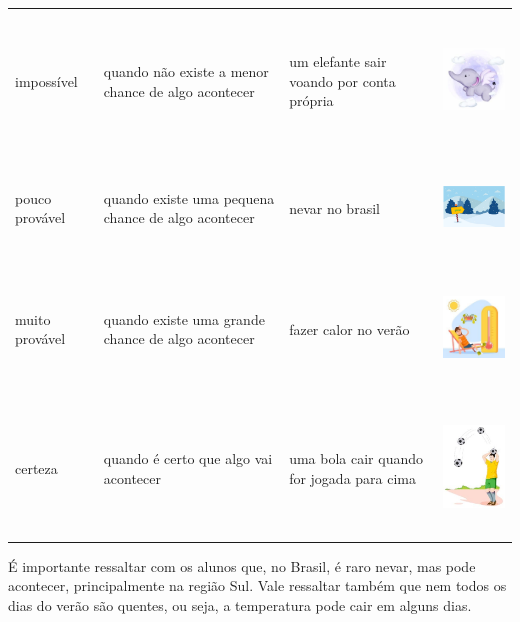 \begin{longtable}[]{@{}llll@{}}
\toprule
impossível & quando não existe a menor chance de algo acontecer & um
elefante sair voando por conta própria &
\includegraphics[width=1.42708in,height=1.42708in]{media/image76.jpg}\tabularnewline
pouco provável & quando existe uma pequena chance de algo acontecer &
nevar no brasil &
\includegraphics[width=1.52602in,height=1.01167in]{media/image77.png}\tabularnewline
muito provável & quando existe uma grande chance de algo acontecer &
fazer calor no verão &
\includegraphics[width=1.30208in,height=1.30208in]{media/image78.jpg}\tabularnewline
certeza & quando é certo que algo vai acontecer & uma bola cair quando
for jogada para cima &
\includegraphics[width=1.04437in,height=1.39696in]{media/image79.jpg}\tabularnewline
\bottomrule
\end{longtable}

É importante ressaltar com os alunos que, no Brasil, é raro
nevar, mas pode acontecer, principalmente na região Sul. Vale
ressaltar também que nem todos os dias do verão são quentes, ou seja, a
temperatura pode cair em alguns dias.

